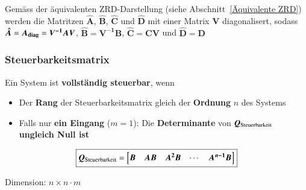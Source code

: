Gemäss der äquivalenten ZRD-Darstellung (siehe Abschnitt~\ref{Äquivalente ZRD}) werden die Matritzen $\bm{\hat{A}}$,
$\bm{\hat{B}}$, $\bm{\hat{C}}$ und $\bm{\hat{D}}$ mit einer Matrix $\bm{V}$ diagonalisert, sodass 
$\bm{\hat{A}} = \bm{A_{\rm diag}} = \bm{V^{-1} A V}$, $\bm{\hat{B}} = \bm{V^{-1} B}$, 
$\bm{\hat{C}} = \bm{C V}$ und $\bm{\hat{D}} = \bm{D}$

\vspace{0.2cm}

\vspace{0.2cm}



\subsubsection{Steuerbarkeitsmatrix}

Ein System ist \textbf{vollständig steuerbar}, wenn
\begin{itemize}
    \item Der \textbf{Rang} der Steuerbarkeitsmatrix gleich der \textbf{Ordnung} $n$ des Systems
    \item Falls nur \textbf{ein Eingang} ($m = 1$): Die \textbf{Determinante} von $\bm{Q}_{\rm Steuerbarkeit}$ 
        \textbf{ungleich Null ist}
\end{itemize}

\begin{minipage}[c]{0.6\columnwidth}
    $$ \boxed{ \bm{Q}_{\rm Steuerbarkeit} = 
    \begin{bmatrix}
        \bm{B} & \bm{A B} & \bm{A^2 B} & \cdots & \bm{A^{n-1} B} 
    \end{bmatrix} } $$
\end{minipage}
\hfill
\begin{minipage}[c]{0.38\columnwidth}
    Dimension: $n \times n \cdot m$
\end{minipage}


